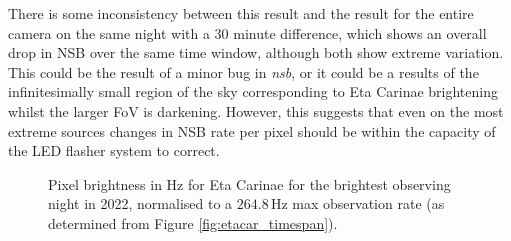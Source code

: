 There is some inconsistency between this result and the result for the entire camera on the same night with a 30 minute difference, which shows an overall drop in NSB over the same time window, although both show extreme variation. This could be the result of a minor bug in \textit{nsb}, or it could be a results of the infinitesimally small region of the sky corresponding to Eta Carinae brightening whilst the larger FoV is darkening. However, this suggests that even on the most extreme sources changes in NSB rate per pixel should be within the capacity of the LED flasher system to correct. 

\begin{figure}[ht]
\begin{centering}
\caption{Pixel brightness in Hz for Eta Carinae for the brightest observing night in 2022, normalised to a $\mathrm{264.8\,}$Hz max observation rate (as determined from Figure \ref{fig:etacar_timespan}).}
\label{fig:etacar_timespan_extreme}
\end{centering}
\end{figure}
\newpage
